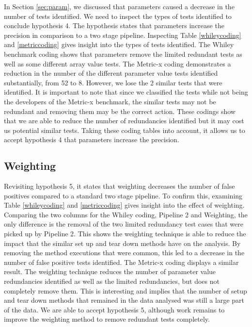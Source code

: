 In Section \ref{sec:param}, we discussed that parameters caused a decrease in the number of tests identified. We need to inspect the types of tests identified to conclude hypothesis 4. The hypothesis states that parameters increase the precision in comparison to a two stage pipeline. Inspecting Table \ref{whileycoding} and \ref{metriccoding} gives insight into the types of tests identified. The Whiley benchmark coding shows that parameters remove the limited redundant tests as well as some different array value tests. The Metric-x coding demonstrates a reduction in the number of the different parameter value tests identified substantially, from 52 to 8. However, we lose the 2 similar tests that were identified. It is important to note that since we classified the tests while not being the developers of the Metric-x benchmark, the similar tests may not be redundant and removing them may be the correct action. These codings show that we are able to reduce the number of redundancies identified but it may cost us potential similar tests. Taking these coding tables into account, it allows us to accept hypothesis 4 that parameters increase the precision. 

\subsection{Weighting}

Revisiting hypothesis 5, it states that weighting decreases the number of false positives compared to a standard two stage pipeline. To confirm this, examining Table \ref{whileycoding} and \ref{metriccoding} gives insight into the effect of weighting. Comparing the two columns for the Whiley coding, Pipeline 2 and Weighting, the only difference is the removal of the two limited redundancy test cases that were picked up by Pipeline 2. This shows the weighting technique is able to reduce the impact that the similar set up and tear down methods have on the analysis. By removing the method executions that were common, this led to a decrease in the number of false positive tests identified. The Metric-x coding displays a similar result. The weighting technique reduces the number of parameter value redundancies identified as well as the limited redundancies, but does not completely remove them. This is interesting and implies that the number of setup and tear down methods that remained in the data analysed was still a large part of the data. We are able to accept hypothesis 5, although work remains to improve the weighting method to remove redundant tests completely.

